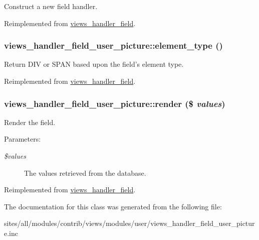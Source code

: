Construct a new field handler. 

Reimplemented from \hyperlink{classviews__handler__field_3d50050864c255b71c842972a45d39f6}{views\_\-handler\_\-field}.\hypertarget{classviews__handler__field__user__picture_a489de4d3a5f1d5656bad62545ee81ec}{
\subsubsection[{element\_\-type}]{\setlength{\rightskip}{0pt plus 5cm}views\_\-handler\_\-field\_\-user\_\-picture::element\_\-type ()}}
\label{classviews__handler__field__user__picture_a489de4d3a5f1d5656bad62545ee81ec}


Return DIV or SPAN based upon the field's element type. 

Reimplemented from \hyperlink{classviews__handler__field_dc0ac73a91e5bfb8da464b3a804a7aa9}{views\_\-handler\_\-field}.\hypertarget{classviews__handler__field__user__picture_707edb06f305fa88542f20cbfec36a04}{
\subsubsection[{render}]{\setlength{\rightskip}{0pt plus 5cm}views\_\-handler\_\-field\_\-user\_\-picture::render (\$ {\em values})}}
\label{classviews__handler__field__user__picture_707edb06f305fa88542f20cbfec36a04}


Render the field.

\begin{Desc}
\item[Parameters:]
\begin{description}
\item[{\em \$values}]The values retrieved from the database. \end{description}
\end{Desc}


Reimplemented from \hyperlink{classviews__handler__field_82ff951c5e9ceb97b2eab86f880cbc1e}{views\_\-handler\_\-field}.

The documentation for this class was generated from the following file:\begin{CompactItemize}
\item 
sites/all/modules/contrib/views/modules/user/views\_\-handler\_\-field\_\-user\_\-picture.inc\end{CompactItemize}
